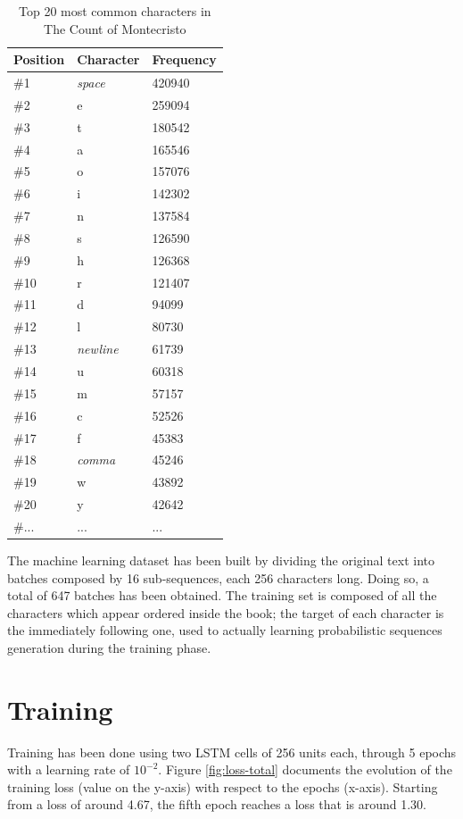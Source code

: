 \documentclass[12pt]{article}
\begin{document}
\begin{table}[h]
	\caption{Top 20 most common characters in The Count of Montecristo}\label{tab:top-chars}
	\centering
	\begin{tabular}{|l|l|l|}
		\hline
		Position & Character & Frequency \\
		\hline
		\#1 & \textit{space} & 420940 \\
		\#2 & e & 259094 \\
		\#3 & t & 180542 \\
		\#4 & a & 165546 \\
		\#5 & o & 157076 \\
		\#6 & i & 142302 \\
		\#7 & n & 137584 \\
		\#8 & s & 126590 \\
		\#9 & h & 126368 \\
		\#10 & r & 121407 \\
		\#11 & d & 94099 \\
		\#12 & l & 80730 \\
		\#13 & \textit{newline} & 61739 \\
		\#14 & u & 60318 \\
		\#15 & m & 57157 \\
		\#16 & c & 52526 \\
		\#17 & f & 45383 \\
		\#18 & \textit{comma} & 45246 \\
		\#19 & w & 43892 \\
		\#20 & y & 42642 \\
		\#... & ... & ... \\
		\hline
	\end{tabular}
\end{table}

The machine learning dataset has been built by dividing the original text into batches composed by 16 sub-sequences, each 256 characters long. Doing so, a total of 647 batches has been obtained. The training set is composed of all the characters which appear ordered inside the book; the target of each character is the immediately following one, used to actually learning probabilistic sequences generation during the training phase.



\section{Training}

Training has been done using two LSTM cells of 256 units each, through 5 epochs with a learning rate of $10^{-2}$. Figure \ref{fig:loss-total} documents the evolution of the training loss (value on the y-axis) with respect to the epochs (x-axis). Starting from a loss of around 4.67, the fifth epoch reaches a loss that is around 1.30.
\end{document}
